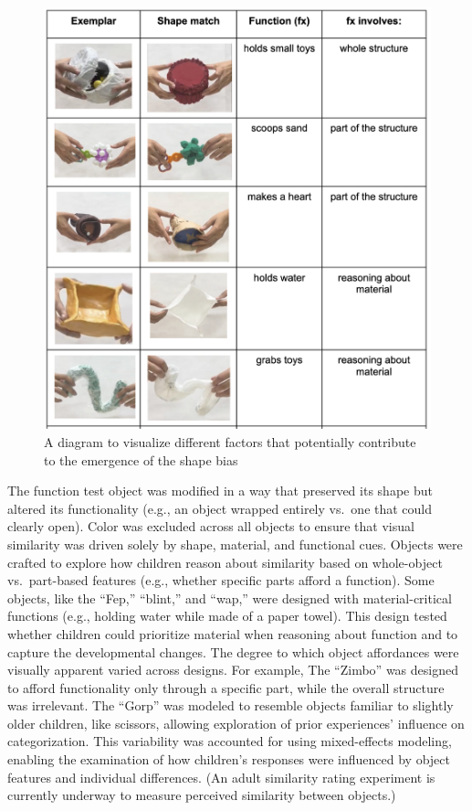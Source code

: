 \documentclass[10pt, letterpaper]{article}
\newenvironment{CodeChunk}{}{}
\begin{document}
\begin{CodeChunk}
\begin{figure}[tb]
\includegraphics[width=1\linewidth]{stimuli} \caption[A diagram to visualize different factors that potentially contribute to the emergence of the shape bias]{A diagram to visualize different factors that potentially contribute to the emergence of the shape bias}\label{fig:stimulipics }
\end{figure}
\end{CodeChunk}

The function test object was modified in a way that preserved its shape
but altered its functionality (e.g., an object wrapped entirely vs.~one
that could clearly open). Color was excluded across all objects to
ensure that visual similarity was driven solely by shape, material, and
functional cues. Objects were crafted to explore how children reason
about similarity based on whole-object vs.~part-based features (e.g.,
whether specific parts afford a function). Some objects, like the
``Fep,'' ``blint,'' and ``wap,'' were designed with material-critical
functions (e.g., holding water while made of a paper towel). This design
tested whether children could prioritize material when reasoning about
function and to capture the developmental changes. The degree to which
object affordances were visually apparent varied across designs. For
example, The ``Zimbo'' was designed to afford functionality only through
a specific part, while the overall structure was irrelevant. The
``Gorp'' was modeled to resemble objects familiar to slightly older
children, like scissors, allowing exploration of prior experiences'
influence on categorization. This variability was accounted for using
mixed-effects modeling, enabling the examination of how children's
responses were influenced by object features and individual differences.
(An adult similarity rating experiment is currently underway to measure
perceived similarity between objects.)
\end{document}
